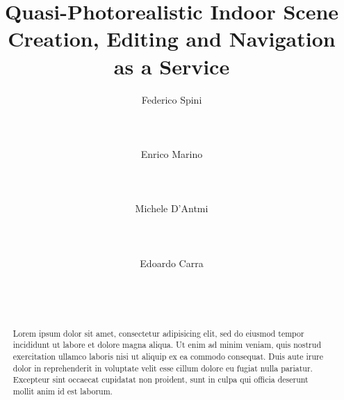 \documentclass{sigchi}
\begin{document}
\title{Quasi-Photorealistic Indoor Scene Creation, Editing and Navigation as a Service}

\author{
\alignauthor Federico Spini\\
      \\
      \\
      \\
\alignauthor Enrico Marino\\
      \\
      \\
      \\
\alignauthor Michele D'Antmi\\
      \\
      \\
      \\
\alignauthor Edoardo Carra\\
      \\
      \\
      \\
}

\maketitle

\begin{abstract}
Lorem ipsum dolor sit amet, consectetur adipisicing elit, sed do eiusmod tempor incididunt ut labore et dolore magna aliqua. Ut enim ad minim veniam, quis nostrud exercitation ullamco laboris nisi ut aliquip ex ea commodo consequat. Duis aute irure dolor in reprehenderit in voluptate velit esse cillum dolore eu fugiat nulla pariatur. Excepteur sint occaecat cupidatat non proident, sunt in culpa qui officia deserunt mollit anim id est laborum.
\end{abstract}

\end{document}
